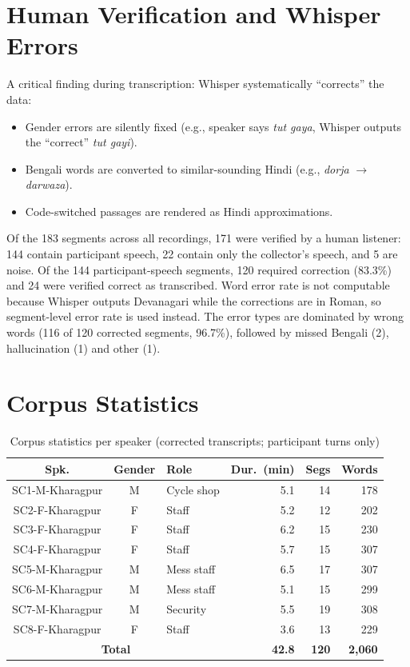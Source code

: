 \documentclass[11pt,a4paper]{report}
\begin{document}
\section{Human Verification and Whisper Errors}

A critical finding during transcription: Whisper systematically ``corrects'' the data:
\begin{itemize}
  \item Gender errors are silently fixed (e.g., speaker says \textit{tut gaya}, Whisper outputs the ``correct'' \textit{tut gayi}).
  \item Bengali words are converted to similar-sounding Hindi (e.g., \textit{dorja} $\to$ \textit{darwaza}).
  \item Code-switched passages are rendered as Hindi approximations.
\end{itemize}

Of the 183 segments across all recordings, 171 were verified by a human listener: 144 contain participant speech, 22 contain only the collector's speech, and 5 are noise. Of the 144 participant-speech segments, 120 required correction (83.3\%) and 24 were verified correct as transcribed. Word error rate is not computable because Whisper outputs Devanagari while the corrections are in Roman, so segment-level error rate is used instead. The error types are dominated by wrong words (116 of 120 corrected segments, 96.7\%), followed by missed Bengali (2), hallucination (1) and other (1).

\section{Corpus Statistics}

\begin{table}[H]
\centering
\caption{Corpus statistics per speaker (corrected transcripts; participant turns only)}
\label{tab:corpusstats}
\begin{tabular}{cclrrr}
\toprule
\textbf{Spk.} & \textbf{Gender} & \textbf{Role} & \textbf{Dur.\ (min)} & \textbf{Segs} & \textbf{Words} \\
\midrule
SC1-M-Kharagpur & M & Cycle shop   & 5.1 & 14 & 178 \\
SC2-F-Kharagpur & F & Staff        & 5.2 & 12 & 202 \\
SC3-F-Kharagpur & F & Staff        & 6.2 & 15 & 230 \\
SC4-F-Kharagpur & F & Staff        & 5.7 & 15 & 307 \\
SC5-M-Kharagpur & M & Mess staff   & 6.5 & 17 & 307 \\
SC6-M-Kharagpur & M & Mess staff   & 5.1 & 15 & 299 \\
SC7-M-Kharagpur & M & Security     & 5.5 & 19 & 308 \\
SC8-F-Kharagpur & F & Staff        & 3.6 & 13 & 229 \\
\midrule
\multicolumn{3}{c}{\textbf{Total}} & \textbf{42.8} & \textbf{120} & \textbf{2,060} \\
\bottomrule
\end{tabular}
\end{table}
\end{document}
